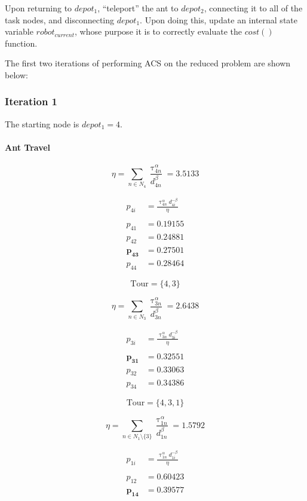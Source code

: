 \documentclass[a4paper]{article}
\newcommand{\subsubsubsection}[1]{\paragraph{#1} \mbox{}}
\begin{document}
Upon returning to $depot_1$, ``teleport'' the ant to $depot_2$, connecting it to all
of the task nodes, and disconnecting $depot_1$. Upon doing this, update an
internal state variable $robot_{current}$, whose purpose it is to correctly
evaluate the $cost()$ function.

The first two iterations of performing ACS on the reduced problem are shown below:

\subsubsection{Iteration 1}

The starting node is $depot_1 = 4$.


\subsubsubsection{Ant Travel}
$$
\eta = \sum_{n \in N_4} \frac{\uptau_{4n}^\alpha}{d_{4n}^\beta} = 3.5133
$$

\begin{align*}
p_{4i} &= \frac{\uptau_{4n}^\alpha d_{4i}^{-\beta}}{\eta} \\
\\
p_{41} &= 0.19155 \\
p_{42} &= 0.24881 \\
\mathbf{p_{43}} &= \mathbf{0.27501} \\
p_{44} &= 0.28464
\end{align*}

$$
\text{Tour} = \{4, 3\}
$$


$$
\eta = \sum_{n \in N_3} \frac{\uptau_{3n}^\alpha}{d_{3n}^\beta} = 2.6438
$$

\begin{align*}
p_{3i} &= \frac{\uptau_{3n}^\alpha d_{3i}^{-\beta}}{\eta} \\
\\
\mathbf{p_{31}} &= \mathbf{0.32551} \\
p_{32} &= 0.33063 \\
p_{34} &= 0.34386
\end{align*}

$$
\text{Tour} = \{4, 3, 1\}
$$


$$
\eta = \sum_{n \in N_1\setminus\{3\}} \frac{\uptau_{1n}^\alpha}{d_{1n}^\beta} = 1.5792
$$

\begin{align*}
p_{1i} &= \frac{\uptau_{1n}^\alpha d_{1i}^{-\beta}}{\eta} \\
\\
p_{12} &= 0.60423 \\
\mathbf{p_{14}} &= \mathbf{0.39577}
\end{align*}
\end{document}
